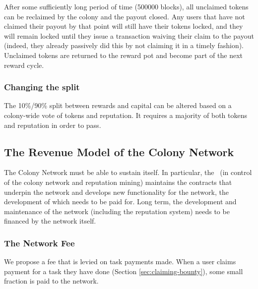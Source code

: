 After some sufficiently long period of time (500000 blocks), all unclaimed tokens can be reclaimed by the colony and the payout closed. Any users that have not claimed their payout by that point will still have their tokens locked, and they will remain locked until they issue a transaction waiving their claim to the payout (indeed, they already passively did this by not claiming it in a timely fashion). Unclaimed tokens are returned to the reward pot and become part of the next reward cycle.


\subsubsection{Changing the split}\label{subsec:chaning-the-reward-split}

The 10\%/90\% split between rewards and capital can be altered based on a colony-wide vote of tokens and reputation. It requires a majority of both tokens and reputation in order to pass.




\subsection{The Revenue Model of the Colony Network}\label{sec:networkrevenue}
The Colony Network must be able to sustain itself. In particular, the \rc\ (in control of the colony network and reputation mining) maintains the contracts that underpin the network and develops new functionality for the network, the development of which needs to be paid for. Long term, the development and maintenance of the network (including the reputation system) needs to be financed by the network itself. 

\subsubsection{The Network Fee}\label{sec:networkfee}
We propose a fee that is levied on task payments made. When a user claims payment for a task they have done (Section \ref{sec:claiming-bounty}), some small fraction is paid to the network. 

